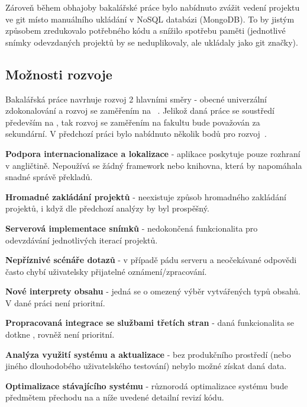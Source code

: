 Zároveň během obhajoby bakalářské práce bylo nabídnuto zvážit vedení projektu ve  git místo manuálního ukládání v NoSQL databázi (MongoDB).
To by jistým způsobem zredukovalo potřebného kódu a snížilo spotřebu paměti (jednotlivé snímky odevzdaných projektů by se neduplikovaly, ale ukládaly jako git značky).



\subsection{Možnosti rozvoje}

Bakalářská práce navrhuje rozvoj 2 hlavními směry - obecné univerzální zdokonalování a rozvoj se zaměřením na  ~\cite{bachelorthesis}.
Jelikož daná práce se soustředí především na , tak rozvoj se zaměřením na fakultu bude považován za sekundární.
V předchozí práci bylo nabídnuto několik bodů pro rozvoj~\cite{bachelorthesis}.


\begin{ul}
   \item
   \textbf{Podpora internacionalizace a lokalizace} - aplikace poskytuje pouze rozhraní v angličtině.
   Nepoužívá se žádný framework nebo knihovna, která by napomáhala snadné správě překladů.
   \item
   \textbf{Hromadné zakládání projektů} - neexistuje způsob hromadného zakládání projektů, i když dle předchozí analýzy by byl prospěšný.
   \item
   \textbf{Serverová implementace snímků} - nedokončená funkcionalita pro odevzdávání jednotlivých iterací projektů.
   \item
   \textbf{Nepříznivé scénáře  dotazů} - v případě pádu serveru a neočekávané  odpovědi často chybí uživatelsky přijatelné oznámení/zpracování.
   \item
   \textbf{Nové interprety obsahu} - jedná se o omezený výběr vytvářených typů obsahů.
   V dané práci není prioritní.
   \item
   \textbf{Propracovaná integrace se službami třetích stran} - daná funkcionalita se dotkne , rovněž není prioritní.
   \item
   \textbf{Analýza využití systému a aktualizace } - bez produkčního prostředí (nebo jiného dlouhodobého uživatelského testování) nebylo možné získat daná data.
   \item
   \textbf{Optimalizace stávajícího systému} - různorodá optimalizace systému bude předmětem přechodu na  a níže uvedené detailní revizí kódu.
\end{ul}

